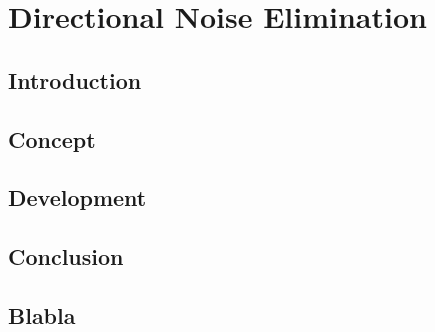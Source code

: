 \chapter{Directional Noise Elimination}\label{DirectionalNoiseElimination}
\section{Introduction}
\section{Concept}
\section{Development}
\section{Conclusion}
\section{Blabla}
